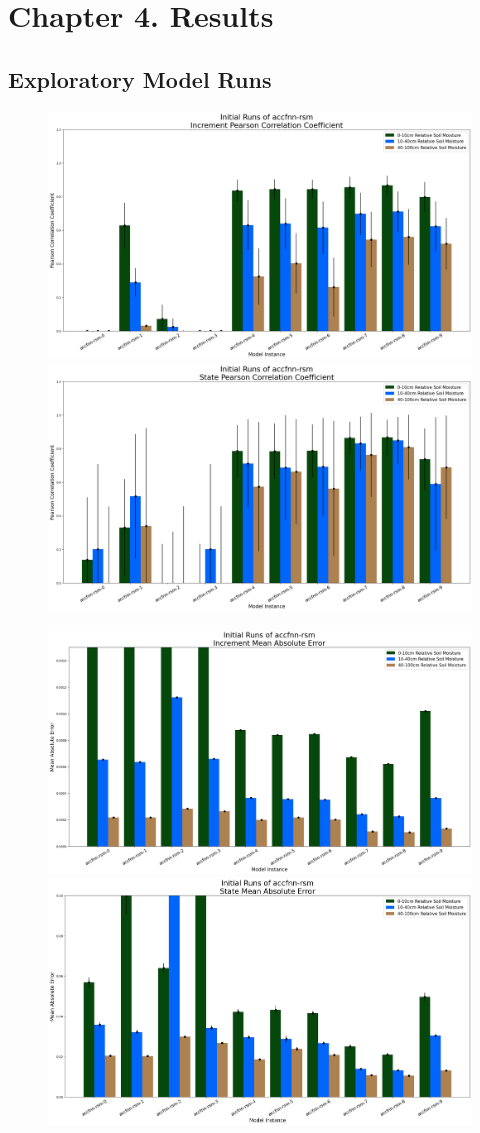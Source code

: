 \chapter{Chapter 4. Results}

\section{Exploratory Model Runs}

\begin{figure}[hp!]
    \centering
    \includegraphics[width=.48\linewidth,draft=false]{figures/efficiency_initial-best/eval_test_efficiency_initial-accfnn-rsm_cc_res.png}
    \includegraphics[width=.48\linewidth,draft=false]{figures/efficiency_initial-best/eval_test_efficiency_initial-accfnn-rsm_cc_state.png}

    \includegraphics[width=.48\linewidth,draft=false]{figures/efficiency_initial-best/eval_test_efficiency_initial-accfnn-rsm_mae_res.png}
    \includegraphics[width=.48\linewidth,draft=false]{figures/efficiency_initial-best/eval_test_efficiency_initial-accfnn-rsm_mae_state.png}


\end{figure}
